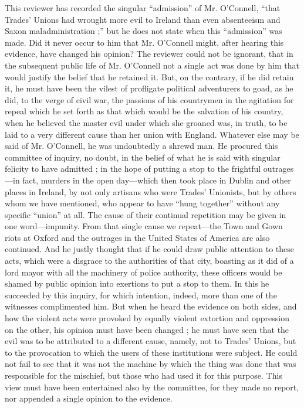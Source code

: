 This reviewer has recorded the singular ``admission'' of Mr. O'Connell,
``that Trades' Unions had wrought more evil to Ireland than even
absenteeism and Saxon maladministration ;'' but he does not state when
this ``admission'' was made. Did it never occur to him that Mr.
O'Connell might, after hearing this evidence, have changed his opinion?
The reviewer could not be ignorant, that in the subsequent public life
of Mr. O'Connell not a single act was done by him that would justify the
belief that he retained it. But, on the contrary, if he did retain it,
he must have been the vilest of profligate political adventurers to
goad, as he did, to the verge of civil war, the passions of his
countrymen in the agitation for repeal which he set forth as that which
would be the salvation of his country, when he believed the master evil
under which she groaned was, in truth, to be laid to a very different
cause than her union with England. Whatever else may be said of Mr.
O'Connell, he was undoubtedly a shrewd man. He procured this committee
of inquiry, no doubt, in the belief of what he is said with singular
felicity to have admitted ; in the hope of putting a stop to the
frightful outrages---in fact, murders in the open day---which then took
place in Dublin and other places in Ireland, by not only artisans who
were Trades' Unionists, but by others whom we have mentioned, who appear
to have ``hung together'' without any specific ``union'' at all. The
cause of their continual repetition may be given in one word---impunity.
From that single cause we repeat---the Town and Gown riots at Oxford and
the outrages in the United States of America are also continued. And he
justly thought that if he could draw public attention to these acts,
which were a disgrace to the authorities of that city, boasting as it
did of a lord mayor with all the machinery of police authority, these
officers would be shamed by public opinion into exertions to put a stop
to them. In this he succeeded by this inquiry, for which intention,
indeed, more than one of the witnesses complimented him. But when he
heard the evidence on both sides, and how the violent acts were provoked
by equally violent extortion and oppression on the other, his opinion
must have been changed ; he must have seen that the evil was to be
attributed to a different cause, namely, not to Trades' Unions, but to
the provocation to which the users of these institutions were subject.
He could not fail to see that it was not the machine by which the thing
was done that was responsible for the mischief, but those who had used
it for this purpose. This view must have been entertained also by the
committee, for they made no report, nor appended a single opinion to the
evidence.

